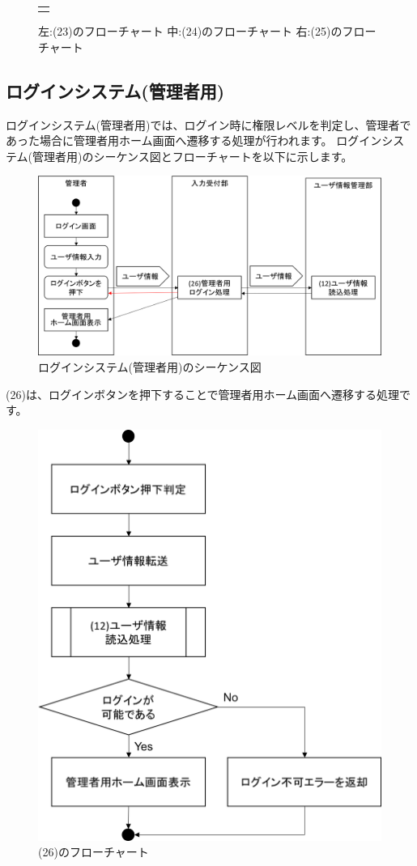 \begin{figure}[htbp]
\begin{tabular}{c}
\begin{minipage}{0.33\hsize}
\begin{center}
  \end{center}
 \end{minipage}
\end{tabular}
 \caption{左:(23)のフローチャート 中:(24)のフローチャート 右:(25)のフローチャート}\label{fig:23to24to25}
\end{figure}


\clearpage


\subsection{ログインシステム(管理者用)}
ログインシステム(管理者用)では、ログイン時に権限レベルを判定し、管理者であった場合に管理者用ホーム画面へ遷移する処理が行われます。
ログインシステム(管理者用)のシーケンス図とフローチャートを以下に示します。

\begin{figure}[htbp]
  \begin{center}
    \includegraphics[width=1\linewidth,clip]{./img/seq6.png}
    \caption{ログインシステム(管理者用)のシーケンス図}\label{fig:seq6}
  \end{center}
\end{figure}

(26)は、ログインボタンを押下することで管理者用ホーム画面へ遷移する処理です。


\begin{figure}[htbp]
  \begin{center}
    \includegraphics[width=0.55\linewidth,clip]{./img/flow/26.png}
    \caption{(26)のフローチャート}\label{fig:26}
  \end{center}
\end{figure}

